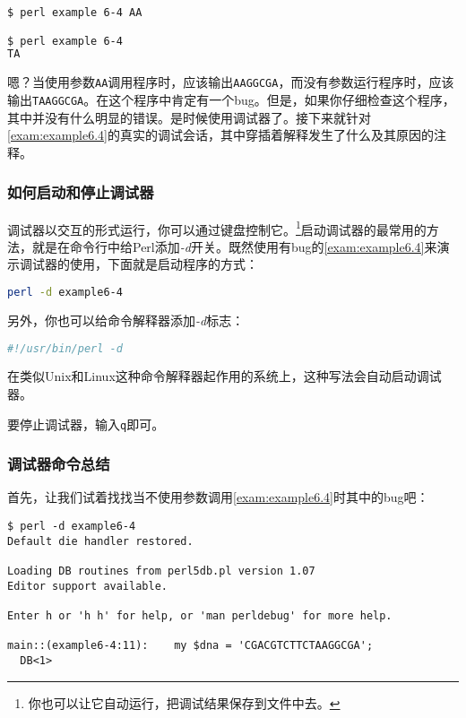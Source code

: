 \begin{lstlisting}[language=bash]
$ perl example 6-4 AA

$ perl example 6-4
TA
\end{lstlisting}

嗯？当使用参数\verb|AA|调用程序时，应该输出\verb|AAGGCGA|，而没有参数运行程序时，应该输出\verb|TAAGGCGA|。在这个程序中肯定有一个bug。但是，如果你仔细检查这个程序，其中并没有什么明显的错误。是时候使用调试器了。接下来就针对\autoref{exam:example6.4}的真实的调试会话，其中穿插着解释发生了什么及其原因的注释。

\subsubsection{如何启动和停止调试器}
调试器以交互的形式运行，你可以通过键盘控制它。\footnote{你也可以让它自动运行，把调试结果保存到文件中去。}启动调试器的最常用的方法，就是在命令行中给Perl添加\textit{-d}开关。既然使用有bug的\autoref{exam:example6.4}来演示调试器的使用，下面就是启动程序的方式：

\begin{lstlisting}[language=bash]
perl -d example6-4
\end{lstlisting}

另外，你也可以给命令解释器添加\textit{-d}标志：

\begin{lstlisting}[language=bash]
#!/usr/bin/perl -d
\end{lstlisting}

在类似Unix和Linux这种命令解释器起作用的系统上，这种写法会自动启动调试器。

要停止调试器，输入\verb|q|即可。

\subsubsection{调试器命令总结}
首先，让我们试着找找当不使用参数调用\autoref{exam:example6.4}时其中的bug吧：

\begin{lstlisting}
$ perl -d example6-4
Default die handler restored.

Loading DB routines from perl5db.pl version 1.07
Editor support available.

Enter h or 'h h' for help, or 'man perldebug' for more help.

main::(example6-4:11):    my $dna = 'CGACGTCTTCTAAGGCGA';
  DB<1> 
\end{lstlisting}

